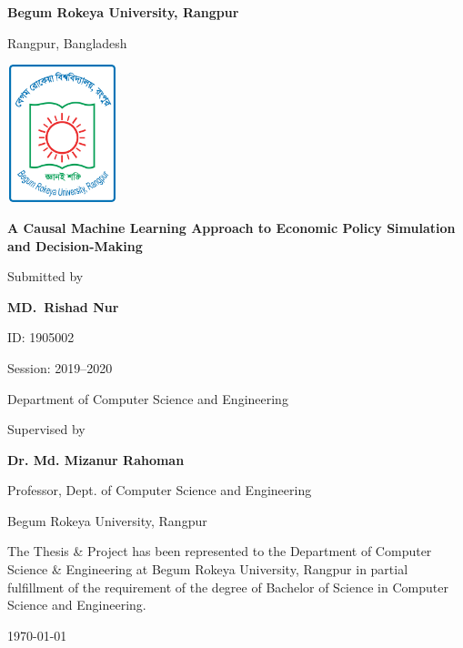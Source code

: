 \begin{titlepage}
    \centering
    
    {\LARGE\bfseries Begum Rokeya University, Rangpur\par}
    {\large Rangpur, Bangladesh\par}
    
    \vspace{1cm}
    
    \includegraphics[width=3.2cm,height=4cm]{images/BRUR_Logo.png}
    
    \vspace{1cm}
    
    {\LARGE\bfseries A Causal Machine Learning Approach to Economic Policy Simulation and Decision-Making\par}
    

    \vspace{2cm}
    
    Submitted by\par
    \textbf{MD.\ Rishad Nur}\par
    ID: 1905002\par
    Session: 2019--2020\par
    Department of Computer Science and Engineering\par

    \vspace{1cm}

    Supervised by\par
    \textbf{Dr. Md. Mizanur Rahoman}\par
    Professor, Dept. of Computer Science and Engineering\par
    Begum Rokeya University, Rangpur\par

    \vspace{1cm}
    
    {\small
    \begin{flushleft}
    The Thesis \& Project has been represented to the Department of Computer Science \& Engineering at Begum Rokeya University, Rangpur in partial fulfillment of the requirement of the degree of Bachelor of Science in Computer Science and Engineering.
    \end{flushleft}
    }

    \vspace{1cm}

    {\large \today\par}
\end{titlepage}

